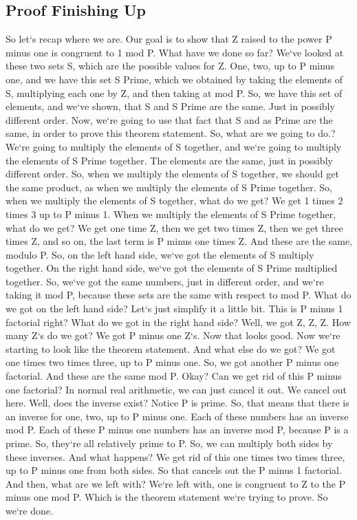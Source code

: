 \subsection{Proof  Finishing Up}
So let`s recap where we are.
Our goal is to show that Z raised to the power P minus one is congruent to 1 mod P\@.
What have we done so far? We`ve looked at these two sets S, which are the possible values for Z\@.
One, two, up to P minus one, and we have this set S Prime, which we obtained by taking the elements of S, multiplying each one by Z, and then taking at mod P\@.
So, we have this set of elements, and we`ve shown, that S and S Prime are the same.
Just in possibly different order.
Now, we`re going to use that fact that S and as Prime are the same, in order to prove this theorem statement.
So, what are we going to do.? We`re going to multiply the elements of S together, and we`re going to multiply the elements of S Prime together.
The elements are the same, just in possibly different order.
So, when we multiply the elements of S together, we should get the same product, as when we multiply the elements of S Prime together.
So, when we multiply the elements of S together, what do we get? We get 1 times 2 times 3 up to P minus 1.
When we multiply the elements of S Prime together, what do we get? We get one time Z, then we get two times Z, then we get three times Z, and so on, the last term is P minus one times Z\@.
And these are the same, modulo P\@.
So, on the left hand side, we`ve got the elements of S multiply together.
On the right hand side, we`ve got the elements of S Prime multiplied together.
So, we`ve got the same numbers, just in different order, and we`re taking it mod P, because these sets are the same with respect to mod P\@.
What do we got on the left hand side? Let`s just simplify it a little bit.
This is P minus 1 factorial right? What do we got in the right hand side? Well, we got Z, Z, Z\@.
How many Z`s do we got? We got P minus one Z`s.
Now that looks good.
Now we`re starting to look like the theorem statement.
And what else do we got? We got one times two times three, up to P minus one.
So, we got another P minus one factorial.
And these are the same mod P\@.
Okay? Can we get rid of this P minus one factorial? In normal real arithmetic, we can just cancel it out.
We cancel out here.
Well, does the inverse exist? Notice P is prime.
So, that means that there is an inverse for one, two, up to P minus one.
Each of these numbers has an inverse mod P\@.
Each of these P minus one numbers has an inverse mod P, because P is a prime.
So, they`re all relatively prime to P\@.
So, we can multiply both sides by these inverses.
And what happens? We get rid of this one times two times three, up to P minus one from both sides.
So that cancels out the P minus 1 factorial.
And then, what are we left with? We`re left with, one is congruent to Z to the P minus one mod P\@.
Which is the theorem statement we`re trying to prove.
So we`re done.

